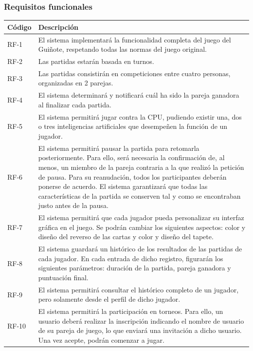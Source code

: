 \documentclass{article}
\begin{document}
\subsubsection{Requisitos funcionales} %
\begin{center}
    \begin{longtable}{ | p{} | p{} | }
        \hline
        \textbf{Código} & \textbf{Descripción} \\
        \hline
        RF-1 & El sistema implementará la funcionalidad completa del juego del Guiñote, respetando todas las normas del juego original. \\
        \hline
        RF-2 & Las partidas estarán basada en turnos. \\
        \hline
        RF-3 & Las partidas consistirán en competiciones entre cuatro personas, organizadas en 2 parejas. \\
        \hline
        RF-4 & El sistema determinará y notificará cuál ha sido la pareja ganadora al finalizar cada partida. \\
        \hline
        RF-5 & El sistema permitirá jugar contra la CPU, pudiendo existir una, dos o tres inteligencias artificiales que desempeñen la función de un jugador. \\
        \hline
        RF-6 & El sistema permitirá pausar la partida para retomarla posteriormente. Para ello, será necesaria la confirmación de, al menos, un miembro de la pareja contraria a la que realizó la petición de pausa.
        Para su reanudación, todos los participantes deberán ponerse de acuerdo. El sistema garantizará que todas las características de la partida se conserven tal y como se encontraban justo antes de la pausa. \\
        \hline
        RF-7 & El sistema permitirá que cada jugador pueda personalizar su interfaz gráfica en el juego. Se podrán cambiar los siguientes aspectos: color y diseño del reverso de las cartas y color y diseño del tapete. \\
        \hline
        RF-8 & El sistema guardará un histórico de los resultados de las partidas de cada jugador. En cada entrada de dicho registro, figurarán los siguientes parámetros: duración de la partida, pareja ganadora y puntuación final. \\
        \hline
        RF-9 & El sistema permitirá consultar el histórico completo de un jugador, pero solamente desde el perfil de dicho jugador. \\
        \hline
        RF-10 & El sistema permitirá la participación en torneos. Para ello, un usuario deberá realizar la inscripción indicando el nombre de usuario de su pareja de juego, lo que enviará una invitación a dicho usuario. Una vez acepte, podrán comenzar a jugar.

\end{longtable}
\end{center}
\end{document}

